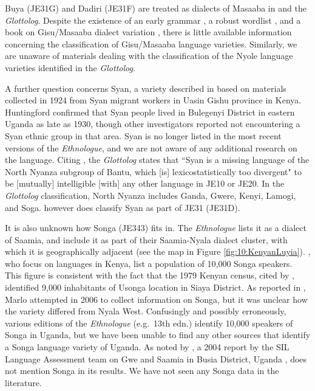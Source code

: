 \documentclass[output=paper]{langscibook}
\begin{document}
Buya (JE31G) and Dadiri (JE31F) are treated as dialects of Masaaba in \citet{maho_nugl_2009} and the \textit{Glottolog}. Despite the existence of an early grammar \citep{purvis_manual_1907}, a robust wordlist \citep{siertsema_masaba_1981}, and a book on Gisu\slash Masaaba dialect variation \citep{brown_phonological_1972}, there is little available information concerning the classification of Gisu\slash Masaaba language varieties. Similarly, we are unaware of materials dealing with the classification of the Nyole language varieties identified in the \textit{Glottolog}.

A further question concerns Syan, a variety described in \citet{huntingford_orusyan_1965} based on materials collected in 1924 from Syan migrant workers in Uasin Gishu province in Kenya. Huntingford confirmed that Syan people lived in Bulegenyi District in eastern Uganda as late as 1930, though other investigators reported not encountering a Syan ethnic group in that area. Syan is no longer listed in the most recent versions of the \textit{Ethnologue}, and we are not aware of any additional research on the language. Citing \citet{schoenbrun_great_1994}, the \textit{Glottolog} states that ``Syan is a missing language of the North Nyanza subgroup of Bantu, which [is] lexicostatistically too divergent" to be [mutually] intelligible [with] any other language in JE10 or JE20. In the \textit{Glottolog} classification, North Nyanza includes Ganda, Gwere, Kenyi, Lamogi, and Soga. \citet{maho_nugl_2009} however does classify Syan as part of JE31 (JE31D).

It is also unknown how Songa (JE343) fits in. The \textit{Ethnologue} lists it as a dialect of Saamia, and \citet[32]{heine_language_1980} include it as part of their Saamia-Nyala dialect cluster, with which it is geographically adjacent (see the map in Figure \ref{fig:10:KenyanLuyia}). \citet[32]{heine_language_1980}, who focus on languages in Kenya, list a population of 10,000 Songa speakers. This figure is consistent with the fact that the 1979 Kenyan census, cited by \citet[26]{were_siaya_1987}, identified 9,000 inhabitants of Usonga location in Siaya District. As reported in \citet[2-3]{marlo_verbal_2007}, Marlo attempted in 2006 to collect information on Songa, but it was unclear how the variety differed from Nyala West. Confusingly and possibly erroneously, various editions of the \textit{Ethnologue} (e.g.\ 13th edn.) identify 10,000 speakers of Songa in Uganda, but we have been unable to find any other sources that identify a Songa language variety of Uganda. As noted by \citet{marlo_luyia_2009}, a 2004 report by the SIL Language Assessment team on Gwe and Saamia in Busia District, Uganda \citep{anderson_lusamia-lugwe_2004}, does not mention Songa in its results. We have not seen any Songa data in the literature.
\end{document}
